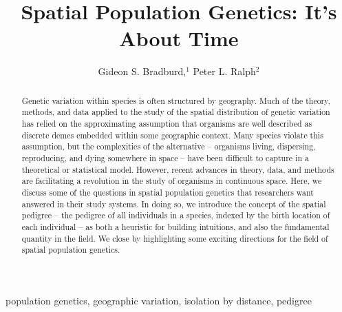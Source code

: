 \documentclass{ar-1col}
\newcommand{\todo}[1]{{\textbf{\color{red}{#1}}}}
\begin{document}

\title{Spatial Population Genetics: It's About Time \todo{we don't really deliver on this title}}


\author{Gideon S. Bradburd,$^1$ Peter L. Ralph$^2$
}

\begin{abstract}

Genetic variation within species is often structured by geography.
Much of the theory, methods, and data applied to the study 
of the spatial distribution of genetic variation 
has relied on the approximating assumption that 
organisms are well described as discrete demes  
embedded within some geographic context.
Many species violate this assumption, 
but the complexities of the alternative -- 
organisms living, dispersing, reproducing, and dying 
somewhere in space -- 
have been difficult to capture in a theoretical or statistical model.
However, recent advances in theory, data, and methods 
are facilitating a revolution in the study of organisms in continuous space.
Here, we discuss some of the questions in spatial population genetics 
that researchers want answered in their study systems.
In doing so, we introduce the concept of the spatial pedigree -- 
the pedigree of all individuals in a species, 
indexed by the birth location of each individual
--
as both a heuristic for building intuitions, 
and also the fundamental quantity in the field.
We close by highlighting some exciting directions 
for the field of spatial population genetics.
\end{abstract}

\begin{keywords}
population genetics, geographic variation, isolation by distance, pedigree
\end{keywords}
\maketitle

\tableofcontents
\end{document}
